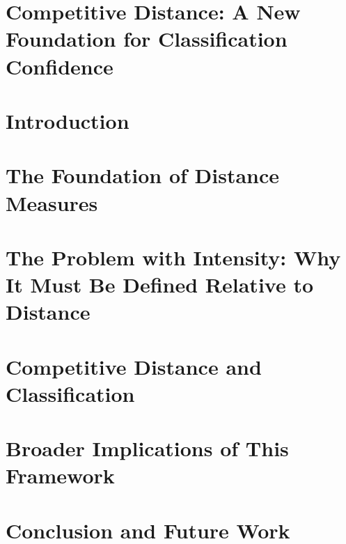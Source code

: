 \documentclass[12pt]{article}
\begin{document}
\section*{Competitive Distance: A New Foundation for Classification Confidence}

\section{Introduction}




\section{The Foundation of Distance Measures}



\section{The Problem with Intensity: Why It Must Be Defined Relative to Distance}




\section{Competitive Distance and Classification}




\section{Broader Implications of This Framework}





\section{Conclusion and Future Work}


\end{document}
